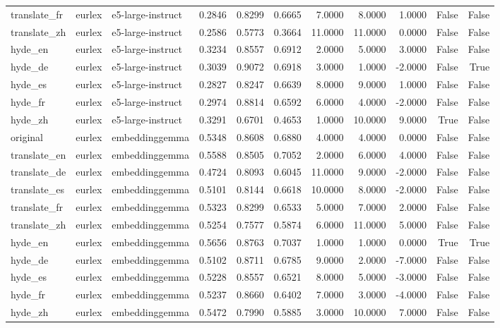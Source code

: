 \begin{tabular}{lllrrrrrrrr}
translate\_fr & eurlex & e5-large-instruct & 0.2846 & 0.8299 & 0.6665 & 7.0000 & 8.0000 & 1.0000 & False & False \\
translate\_zh & eurlex & e5-large-instruct & 0.2586 & 0.5773 & 0.3664 & 11.0000 & 11.0000 & 0.0000 & False & False \\
hyde\_en & eurlex & e5-large-instruct & 0.3234 & 0.8557 & 0.6912 & 2.0000 & 5.0000 & 3.0000 & False & False \\
hyde\_de & eurlex & e5-large-instruct & 0.3039 & 0.9072 & 0.6918 & 3.0000 & 1.0000 & -2.0000 & False & True \\
hyde\_es & eurlex & e5-large-instruct & 0.2827 & 0.8247 & 0.6639 & 8.0000 & 9.0000 & 1.0000 & False & False \\
hyde\_fr & eurlex & e5-large-instruct & 0.2974 & 0.8814 & 0.6592 & 6.0000 & 4.0000 & -2.0000 & False & False \\
hyde\_zh & eurlex & e5-large-instruct & 0.3291 & 0.6701 & 0.4653 & 1.0000 & 10.0000 & 9.0000 & True & False \\
original & eurlex & embeddinggemma & 0.5348 & 0.8608 & 0.6880 & 4.0000 & 4.0000 & 0.0000 & False & False \\
translate\_en & eurlex & embeddinggemma & 0.5588 & 0.8505 & 0.7052 & 2.0000 & 6.0000 & 4.0000 & False & False \\
translate\_de & eurlex & embeddinggemma & 0.4724 & 0.8093 & 0.6045 & 11.0000 & 9.0000 & -2.0000 & False & False \\
translate\_es & eurlex & embeddinggemma & 0.5101 & 0.8144 & 0.6618 & 10.0000 & 8.0000 & -2.0000 & False & False \\
translate\_fr & eurlex & embeddinggemma & 0.5323 & 0.8299 & 0.6533 & 5.0000 & 7.0000 & 2.0000 & False & False \\
translate\_zh & eurlex & embeddinggemma & 0.5254 & 0.7577 & 0.5874 & 6.0000 & 11.0000 & 5.0000 & False & False \\
hyde\_en & eurlex & embeddinggemma & 0.5656 & 0.8763 & 0.7037 & 1.0000 & 1.0000 & 0.0000 & True & True \\
hyde\_de & eurlex & embeddinggemma & 0.5102 & 0.8711 & 0.6785 & 9.0000 & 2.0000 & -7.0000 & False & False \\
hyde\_es & eurlex & embeddinggemma & 0.5228 & 0.8557 & 0.6521 & 8.0000 & 5.0000 & -3.0000 & False & False \\
hyde\_fr & eurlex & embeddinggemma & 0.5237 & 0.8660 & 0.6402 & 7.0000 & 3.0000 & -4.0000 & False & False \\
hyde\_zh & eurlex & embeddinggemma & 0.5472 & 0.7990 & 0.5885 & 3.0000 & 10.0000 & 7.0000 & False & False \\

\end{tabular}

